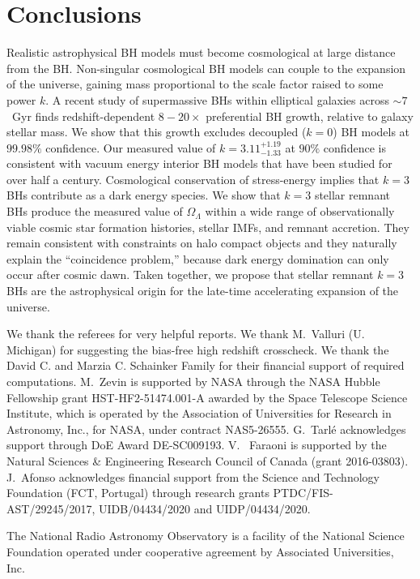 \documentclass[twocolumn,twocolappendix]{aastex631}
\begin{document}
\section{Conclusions}
Realistic astrophysical BH models must become cosmological at large distance from the BH.
Non-singular cosmological BH models can couple to the expansion of the universe, gaining mass proportional to the scale factor raised to some power $k$.
A recent study of supermassive BHs within elliptical galaxies across $\sim 7$~Gyr finds redshift-dependent $8-20\times$ preferential BH growth, relative to galaxy stellar mass.
We show that this growth excludes decoupled ($k=0$) BH models at $99.98\%$ confidence.
Our measured value of $k=3.11^{+1.19}_{-1.33}$ at $90\%$ confidence is consistent with vacuum energy interior BH models that have been studied for over half a century.
Cosmological conservation of stress-energy implies that $k=3$ BHs contribute as a dark energy species.
We show that $k=3$ stellar remnant BHs produce the measured value of $\Omega_\Lambda$ within a wide range of observationally viable cosmic star formation histories, stellar IMFs, and remnant accretion.
They remain consistent with constraints on halo compact objects and they naturally explain the ``coincidence problem,'' because dark energy domination can only occur after cosmic dawn.
Taken together, we propose that stellar remnant $k=3$ BHs are the astrophysical origin for the late-time accelerating expansion of the universe.

\begin{acknowledgments}
We thank the referees for very helpful reports.  
We thank M.~Valluri (U. Michigan) for suggesting the bias-free high redshift crosscheck.
We thank the David C. and Marzia C. Schainker Family for their financial support of required computations.
M.~Zevin is supported by NASA through the NASA Hubble Fellowship grant HST-HF2-51474.001-A awarded by the Space Telescope Science Institute, which is operated by the Association of Universities for Research in Astronomy, Inc., for NASA, under contract NAS5-26555.
G.~Tarl\'e acknowledges support through DoE Award DE-SC009193.
V.~ Faraoni is supported by the Natural Sciences \& Engineering Research Council of Canada (grant 2016-03803).
J.~Afonso acknowledges financial support from the Science and Technology Foundation (FCT, Portugal) through research grants PTDC/FIS-AST/29245/2017, UIDB/04434/2020 and UIDP/04434/2020.

The National Radio Astronomy Observatory is a facility of the National Science Foundation operated under cooperative agreement by Associated Universities, Inc.
\end{acknowledgments}
\end{document}
